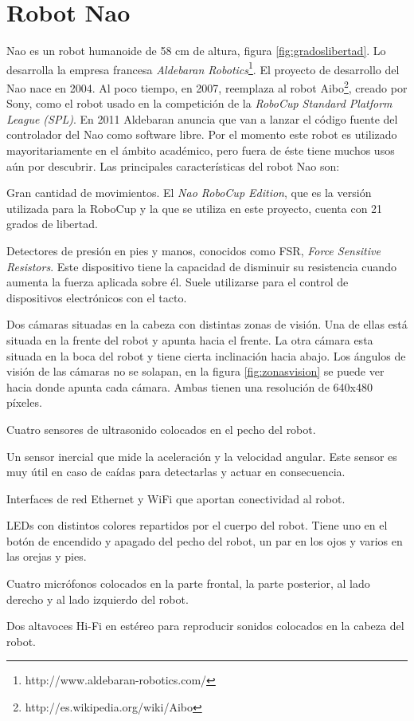 \section{Robot Nao}
\label{sec:robotnao}

 Nao es un robot humanoide de 58 cm de altura, figura \ref{fig:gradoslibertad}. Lo desarrolla la empresa francesa \textit{Aldebaran Robotics}\footnote{http://www.aldebaran-robotics.com/}. El proyecto de desarrollo del Nao nace en 2004. Al poco tiempo, en 2007, reemplaza al robot Aibo\footnote{http://es.wikipedia.org/wiki/Aibo}, creado por Sony, como el robot usado en la competición de la \textit{RoboCup Standard Platform League (SPL)}. En 2011 Aldebaran anuncia que van a lanzar el código fuente del controlador del Nao como software libre. Por el momento este robot es utilizado mayoritariamente en el ámbito académico, pero fuera de éste tiene muchos usos aún por descubrir. Las principales características del robot Nao son:

\begin{packed_item}
\item Gran cantidad de movimientos. El \textit{Nao RoboCup Edition}, que es la versión utilizada para la RoboCup y la que se utiliza en este proyecto, cuenta con 21 grados de libertad.
\item Detectores de presión en pies y manos, conocidos como FSR, \textit{Force Sensitive Resistors}. Este dispositivo tiene la capacidad de disminuir su resistencia cuando aumenta la fuerza aplicada sobre él. Suele utilizarse para el control de dispositivos electrónicos con el tacto.
\item Dos cámaras situadas en la cabeza con distintas zonas de visión. Una de ellas está situada en la frente del robot y apunta hacia el frente. La otra cámara esta situada en la boca del robot y tiene cierta inclinación hacia abajo. Los ángulos de visión de las cámaras no se solapan, en la figura \ref{fig:zonasvision} se puede ver hacia donde apunta cada cámara. Ambas tienen una resolución de 640x480 píxeles.
\item Cuatro sensores de ultrasonido colocados en el pecho del robot.
\item Un sensor inercial que mide la aceleración y la velocidad angular. Este sensor es muy útil en caso de caídas para detectarlas y actuar en consecuencia.
\item Interfaces de red Ethernet y WiFi que aportan conectividad al robot.
\item LEDs con distintos colores repartidos por el cuerpo del robot. Tiene uno en el botón de encendido y apagado del pecho del robot, un par en los ojos y varios en las orejas y pies.
\item Cuatro micrófonos colocados en la parte frontal, la parte posterior, al lado derecho y al lado izquierdo del robot.
\item Dos altavoces Hi-Fi en estéreo para reproducir sonidos colocados en la cabeza del robot.
\end{packed_item}

